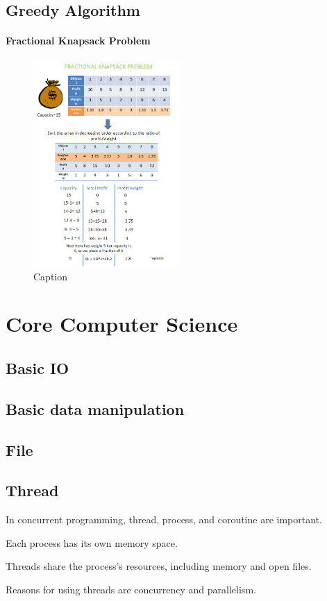 \documentclass[12pt, a4paper]{report}
\begin{document}
\section{Greedy Algorithm}
\subsubsection{Fractional Knapsack Problem}
\begin{figure}[H]
    \centering
    \includegraphics[width=0.5\textwidth]{imgs/backpack.png}
    \caption{Caption}
    \label{fig:my_label}
\end{figure}


\chapter{Core Computer Science}
\section{Basic IO}
\section{Basic data manipulation}
\section{File}
\section{Thread}
In concurrent programming, thread, process, and coroutine are important. \par 
Each process has its own memory space. \par 
Threads share the process's resources, including memory and open files. \par 
Reasons for using threads are concurrency and parallelism. 
\end{document}
